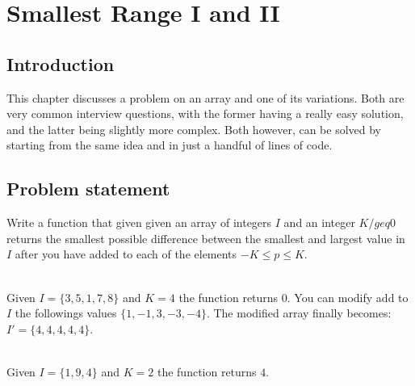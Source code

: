 %



\chapter{Smallest Range \RN{1} and \RN{2}}
\label{ch:smallest_range}
\section*{Introduction}
This chapter discusses a problem on an array and one of its variations. Both are very common
interview questions, with the former having a really easy solution, and the latter being slightly
more complex. Both however, can be solved by starting from the same idea and in just a handful of
lines of code.

\section{Problem statement}
\begin{exercise}
\label{example:smallest_range:exercice1}
Write a function that given given an array of integers $I$ and an integer $K /geq 0$ returns the smallest
possible difference between the smallest and largest value in $I$ after you have added to each of
the elements $-K \leq p \leq K$.

	\begin{example}
		\label{example:smallest_range:example1}
		\hfill \\
		Given $I = \{3,5,1,7,8\}$ and $K=4$ the function returns $0$. You can modify add to $I$ the
		followings values $\{1,-1,3,-3,-4\}$. The modified array finally becomes:
		$I'=\{4,4,4,4,4\}$. 
		
	\end{example}

	\begin{example}
		\label{example:smallest_range:example2}
		\hfill \\
		Given $I = \{1,9,4\}$ and $K=2$ the function returns $4$.
	\end{example}

\end{exercise}

